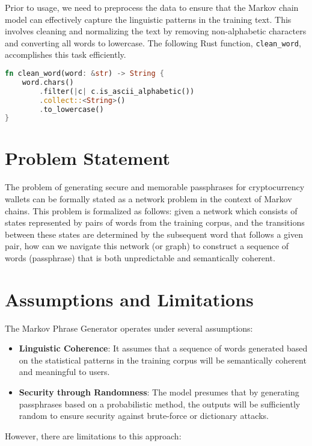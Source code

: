\documentclass[a4paper,12pt]{article}
\begin{document}
Prior to usage, we need to preprocess the data to ensure that the Markov chain model can effectively capture the linguistic patterns in the training text. This involves cleaning and normalizing the text by removing non-alphabetic characters and converting all words to lowercase. The following Rust function, \texttt{clean\_word}, accomplishes this task efficiently.

\begin{lstlisting}[language=Rust, caption={Preprocessing Function}]
  fn clean_word(word: &str) -> String {
    word.chars()
        .filter(|c| c.is_ascii_alphabetic())
        .collect::<String>()
        .to_lowercase()
}
\end{lstlisting}

\section{Problem Statement}
The problem of generating secure and memorable passphrases for cryptocurrency wallets can be formally stated as a network problem in the context of Markov chains. This problem is formalized as follows: given a network which consists of states represented by pairs of words from the training corpus, and the transitions between these states are determined by the subsequent word that follows a given pair,
how can we navigate this network (or graph) to construct a sequence of words (passphrase) that is both unpredictable and semantically coherent. 

\section{Assumptions and Limitations}
The Markov Phrase Generator operates under several assumptions:

\begin{itemize}
  \item \textbf{Linguistic Coherence}: It assumes that a sequence of words generated based on the statistical patterns in the training corpus will be semantically coherent and meaningful to users.
  \item \textbf{Security through Randomness}: The model presumes that by generating passphrases based on a probabilistic method, the outputs will be sufficiently random to ensure security against brute-force or dictionary attacks.
\end{itemize}

However, there are limitations to this approach:
\end{document}
